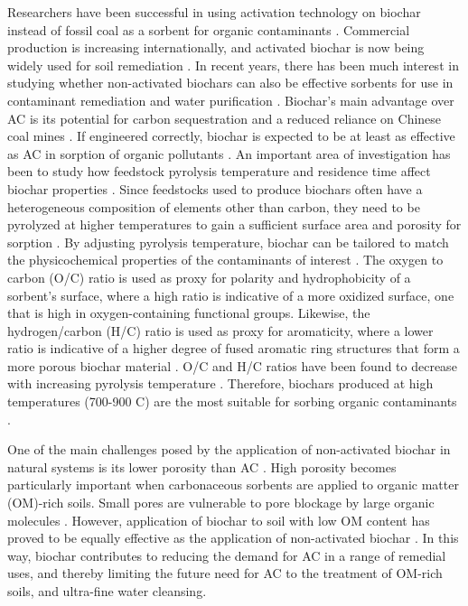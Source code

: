 Researchers have been successful in using activation technology on biochar instead of fossil coal as a sorbent for organic contaminants \citep{Sormo2021}. Commercial production is increasing internationally, and activated biochar is now being widely used for soil remediation \citep{hagemann2018activated}. In recent years, there has been much interest in studying whether non-activated biochars can also be effective sorbents for use in contaminant remediation and water purification \citep{hagemann2018activated}. Biochar's  main advantage over AC is its potential for carbon sequestration \citep{smith2016soil} and a reduced reliance on Chinese coal mines \citep{zheng2019influence}. If engineered correctly, biochar is expected to be at least as effective as AC in sorption of organic pollutants \citep{Sormo2021}. 
An important area of investigation has been to study how feedstock pyrolysis temperature and residence time affect biochar properties \citep{Hale2016}. Since feedstocks used to produce biochars often have a heterogeneous composition of elements other than carbon, they need to be pyrolyzed at higher temperatures to gain a sufficient surface area and porosity for sorption \citep{beesley2011review}. By adjusting pyrolysis temperature, biochar can be tailored to match the physicochemical properties of the contaminants of interest \citep{Hale2016}. The oxygen to carbon (O/C) ratio is used as proxy for polarity and hydrophobicity of a sorbent's surface, where a high ratio is indicative of a more oxidized surface, one that is high in oxygen-containing functional groups. Likewise, the hydrogen/carbon (H/C) ratio is used as proxy for aromaticity, where a lower ratio is indicative of a higher degree of fused aromatic ring structures that form a more porous biochar material \citep{Ahmad2014}. O/C and H/C ratios have been found to decrease with increasing pyrolysis temperature \citep{Hale2016}. Therefore, biochars produced at high temperatures (700-900 \textdegree C) are the most suitable for sorbing organic contaminants \citep{Figueiredo2018}. 

One of the main challenges posed by the application of non-activated biochar in natural systems is its lower porosity than AC \citep{leng2021overview}. High porosity becomes particularly important when carbonaceous sorbents are applied to organic matter (\acrshort{OM})-rich soils. Small pores are vulnerable to pore blockage by large organic molecules \citep{Sorengard2019}. However, application of biochar to soil with low OM content has proved to be equally effective as the application of non-activated biochar \citep{Alhashimi2017}. In this way, biochar contributes to reducing the demand for AC in a range of remedial uses, and thereby limiting the future need for AC to the treatment of OM-rich soils, and ultra-fine water cleansing. 

